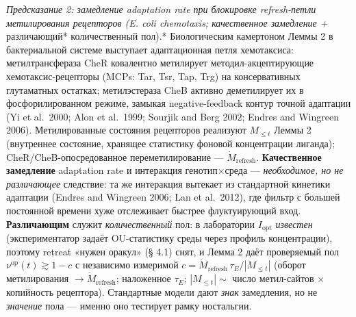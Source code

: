 \documentclass[pdflatex,sn-mathphys-ay]{sn-jnl}
\begin{document}
\emph{Предсказание 2: замедление adaptation rate при блокировке refresh-петли метилирования рецепторов (E. coli chemotaxis; качественное замедление + }различающий* количественный пол).* Биологическим камертоном Леммы 2 в бактериальной системе выступает адаптационная петля хемотаксиса: метилтрансфераза CheR ковалентно метилирует методил-акцептирующие хемотаксис-рецепторы (MCPs: Tar, Tsr, Tap, Trg) на консервативных глутаматных остатках; метилэстераза CheB активно деметилирует их в фосфорилированном режиме, замыкая negative-feedback контур точной адаптации (Yi et al.~2000; Alon et al.~1999; Sourjik and Berg 2002; Endres and Wingreen 2006). Метилированные состояния рецепторов реализуют \(M_{\le t}\) Леммы 2 (внутреннее состояние, хранящее статистику фоновой концентрации лиганда); CheR/CheB-опосредованное переметилирование --- \(\dot M_{\text{refresh}}\). \textbf{Качественное замедление} adaptation rate и интеракция генотип×среда --- \emph{необходимое, но не различающее} следствие: та же интеракция вытекает из стандартной кинетики адаптации (Endres and Wingreen 2006; Lan et al.~2012), где фильтр с большей постоянной времени хуже отслеживает быстрее флуктуирующий вход. \textbf{Различающим} служит \emph{количественный} пол: в лаборатории \(I_{\text{opt}}\) \emph{известен} (экспериментатор задаёт OU-статистику среды через профиль концентрации), поэтому retreat «нужен оракул» (§ 4.1) снят, и Лемма 2 даёт проверяемый пол \(\nu^{\text{op}}(t) \gtrsim 1-c\) с независимо измеримой \(c = \dot M_{\text{refresh}}\,\tau_E/|M_{\le t}|\) (оборот метилирования \(\to \dot M_{\text{refresh}}\); наложенное \(\tau_E\); \(|M_{\le t}| \sim\) число метил-сайтов \(\times\) копийность рецептора). Стандартные модели дают \emph{знак} замедления, но не \emph{значение} пола --- именно оно тестирует рамку ностальгии.
\end{document}
